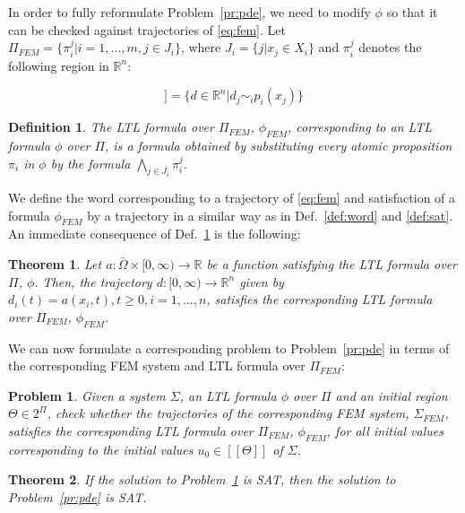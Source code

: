\documentclass{article}
\newtheorem{theorem}{Theorem}
\newtheorem{definition}{Definition}
\newtheorem{problem}{Problem}
\newcommand*{\R}{\mathbb{R}}
\newcommand*{\psat}[1]{[[#1]]}
\begin{document}
In order to fully reformulate Problem~\ref{pr:pde}, we need to modify $\phi$ so
that it can be checked against trajectories of \eqref{eq:fem}. Let $\Pi_{FEM} =
\{\pi_i^j | i =1,...,m, j \in J_i\}$, where $J_i = \{j | x_j \in X_i\}$ and
$\pi_i^j$ denotes the following region in $\R^n$:

\begin{equation}
    \psat{\pi_i^j} = \{d \in \R^n | d_j \sim_i p_i(x_j)\}
\end{equation}

\begin{definition}\label{def:femformula}
    The LTL formula over $\Pi_{FEM}$, $\phi_{FEM}$, corresponding to an LTL formula
    $\phi$ over $\Pi$, is a formula obtained by substituting every atomic
    proposition $\pi_i$ in $\phi$ by the formula $\bigwedge_{j \in J_i}
    \pi_i^j$.
\end{definition}

We define the word corresponding to a trajectory of \eqref{eq:fem} and
satisfaction of a formula $\phi_{FEM}$ by a trajectory in a similar way as in
Def.~\ref{def:word} and \ref{def:sat}. An immediate consequence of
Def.~\ref{def:femformula} is the following:

\begin{theorem}\label{th:equiv}
    Let $a : \bar\Omega \times [0, \infty) \rightarrow \R$ be a function
    satisfying the LTL formula over $\Pi$, $\phi$. Then, the trajectory $d : [0,
    \infty) \rightarrow \R^n$ given by $d_i(t) = a(x_i, t), t \geq 0, i =
    1,...,n$, satisfies the corresponding LTL formula over $\Pi_{FEM}$, $\phi_{FEM}$.
\end{theorem}

We can now formulate a corresponding problem to Problem~\ref{pr:pde} in terms of 
the corresponding FEM system and LTL formula over $\Pi_{FEM}$:

\begin{problem}\label{pr:fem}
    Given a system $\Sigma$, an LTL formula $\phi$ over $\Pi$ and an initial
    region $\Theta \in 2^\Pi$, check whether the trajectories of the corresponding
    FEM system, $\Sigma_{FEM}$, satisfies the corresponding LTL formula over
    $\Pi_{FEM}$, $\phi_{FEM}$, for all initial values corresponding to the
    initial values $u_0 \in \psat{\Theta}$ of $\Sigma$.
\end{problem}

\begin{theorem}
    If the solution to Problem~\ref{pr:fem} is SAT, then the solution to
    Problem~\ref{pr:pde} is SAT.
\end{theorem}
\end{document}

